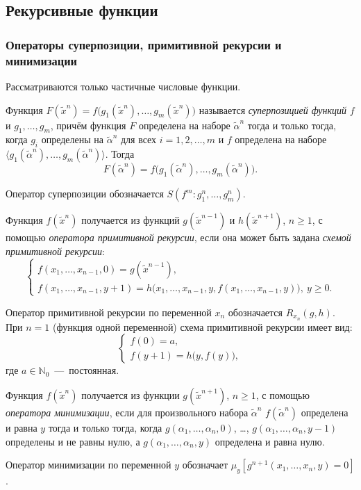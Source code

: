 \subsection{Рекурсивные функции}
\subsubsection{Операторы суперпозиции, примитивной рекурсии и минимизации}
Рассматриваются только частичные числовые функции.
\begin{definition*}
    Функция $F(\widetilde x^n) = f\big(g_1(\widetilde x^n), \dots, g_m(\widetilde x^n)\big)$ называется \textit{суперпозицией функций} $f$ и $g_1, \dots, g_m$, причём функция $F$ определена на наборе $\widetilde\alpha^n$ тогда и только тогда, когда $g_i$ определены на $\widetilde\alpha^n$ для всех $i = 1, 2, \dots, m$ и $f$ определена на наборе $\langle g_1(\widetilde\alpha^n), \dots, g_m(\widetilde \alpha^n)\rangle$. Тогда
    \[
        F(\widetilde\alpha^n) = f\big(g_1(\widetilde\alpha^n), \dots, g_m(\widetilde\alpha^n)\big).
    \]
\end{definition*}
Оператор суперпозиции обозначается $S(f^m\colon g_1^n, \dots, g_m^n)$.
\begin{definition*}
    Функция $f(\widetilde x^n)$ получается из функций $g(\widetilde x^{n - 1})$ и $h(\widetilde x^{n + 1})$, $n \geqslant 1$, с помощью \textit{оператора примитивной рекурсии}, если она может быть задана \textit{схемой примитивной рекурсии}:
    \[
        \begin{cases}
            f(x_1, \dots, x_{n - 1}, 0) = g(\widetilde x^{n - 1}), \\
            f(x_1, \dots, x_{n - 1}, y + 1) = h\big(x_1, \dots, x_{n - 1}, y, f(x_1, \dots, x_{n - 1}, y)\big),\ y \geqslant 0.
        \end{cases}
    \]
\end{definition*}
Оператор примитивной рекурсии по переменной $x_n$ обозначается $R_{x_n}(g, h)$. \\
При $n = 1$ (функция одной переменной) схема примитивной рекурсии имеет вид:
\[
    \begin{cases}
        f(0) = a, \\
        f(y + 1) = h\big(y, f(y)\big),
    \end{cases}
\]
где $a \in \mathbb{N}_0$~---~постоянная.

\begin{definition*}
    Функция $f(\widetilde x^n)$ получается из функции $g(\widetilde x^{n + 1})$, $n \geqslant 1$, с помощью \textit{оператора минимизации}, если для произвольного набора $\widetilde\alpha^n$ $f(\widetilde\alpha^n)$ определена и равна $y$ тогда и только тогда, когда $g(\alpha_1, \dots, \alpha_n, 0)$, \dots, $g(\alpha_1, \dots, \alpha_n, y - 1)$ определены и не равны нулю, а $g(\alpha_1, \dots, \alpha_n, y)$ определена и равна нулю.
\end{definition*}
Оператор минимизации по переменной $y$ обозначает $\mu_y\!\left[g^{n + 1}(x_1, \dots, x_n, y) = 0\right]$.

